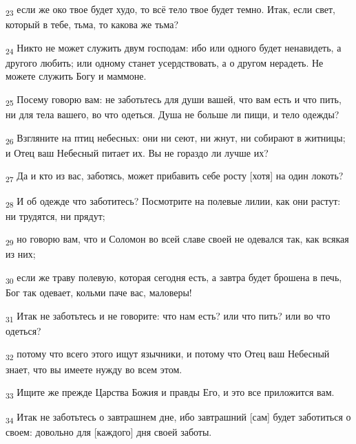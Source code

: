 \begin{tcolorbox}
\textsubscript{23} если же око твое будет худо, то всё тело твое будет темно. Итак, если свет, который в тебе, тьма, то какова же тьма?
\end{tcolorbox}
\begin{tcolorbox}
\textsubscript{24} Никто не может служить двум господам: ибо или одного будет ненавидеть, а другого любить; или одному станет усердствовать, а о другом нерадеть. Не можете служить Богу и маммоне.
\end{tcolorbox}
\begin{tcolorbox}
\textsubscript{25} Посему говорю вам: не заботьтесь для души вашей, что вам есть и что пить, ни для тела вашего, во что одеться. Душа не больше ли пищи, и тело одежды?
\end{tcolorbox}
\begin{tcolorbox}
\textsubscript{26} Взгляните на птиц небесных: они ни сеют, ни жнут, ни собирают в житницы; и Отец ваш Небесный питает их. Вы не гораздо ли лучше их?
\end{tcolorbox}
\begin{tcolorbox}
\textsubscript{27} Да и кто из вас, заботясь, может прибавить себе росту [хотя] на один локоть?
\end{tcolorbox}
\begin{tcolorbox}
\textsubscript{28} И об одежде что заботитесь? Посмотрите на полевые лилии, как они растут: ни трудятся, ни прядут;
\end{tcolorbox}
\begin{tcolorbox}
\textsubscript{29} но говорю вам, что и Соломон во всей славе своей не одевался так, как всякая из них;
\end{tcolorbox}
\begin{tcolorbox}
\textsubscript{30} если же траву полевую, которая сегодня есть, а завтра будет брошена в печь, Бог так одевает, кольми паче вас, маловеры!
\end{tcolorbox}
\begin{tcolorbox}
\textsubscript{31} Итак не заботьтесь и не говорите: что нам есть? или что пить? или во что одеться?
\end{tcolorbox}
\begin{tcolorbox}
\textsubscript{32} потому что всего этого ищут язычники, и потому что Отец ваш Небесный знает, что вы имеете нужду во всем этом.
\end{tcolorbox}
\begin{tcolorbox}
\textsubscript{33} Ищите же прежде Царства Божия и правды Его, и это все приложится вам.
\end{tcolorbox}
\begin{tcolorbox}
\textsubscript{34} Итак не заботьтесь о завтрашнем дне, ибо завтрашний [сам] будет заботиться о своем: довольно для [каждого] дня своей заботы.
\end{tcolorbox}
